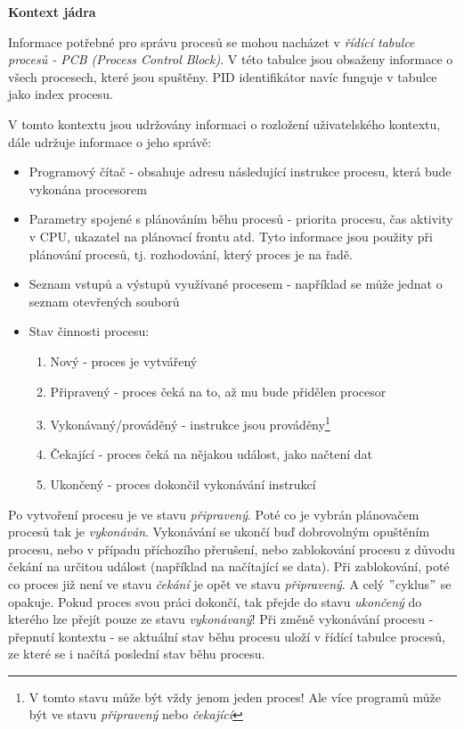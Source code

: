 \begin{Large}
    \vspace{0,5cm}
    \textbf{Kontext jádra}
\end{Large}

Informace potřebné pro správu procesů se mohou nacházet v \textit{řídící tabulce procesů - PCB (Process Control Block)}. V této tabulce jsou obsaženy informace o všech procesech, které jsou spuštěny. PID identifikátor navíc funguje v tabulce jako index procesu. 

\vspace{0,5cm}

V tomto kontextu jsou udržovány informaci o rozložení uživatelského kontextu, dále udržuje informace o jeho správě:
\begin{itemize}
    \item Programový čítač - obsahuje adresu následující instrukce procesu, která bude vykonána procesorem
    \item Parametry spojené s plánováním běhu procesů - priorita procesu, čas aktivity v CPU, ukazatel na plánovací frontu atd. Tyto informace jsou použity při plánování procesů, tj. rozhodování, který proces je na řadě. 
    \item Seznam vstupů a výstupů využívané procesem - například se může jednat o seznam otevřených souborů
    
    \newpage
    
    \item Stav činnosti procesu:
    \begin{enumerate}
        \item Nový - proces je vytvářený
        \item Připravený - proces čeká na to, až mu bude přidělen procesor
        \item Vykonávaný/prováděný - instrukce jsou prováděny\footnote{V tomto stavu může být vždy jenom jeden proces! Ale více programů může být ve stavu \textit{připravený} nebo \textit{čekající}}
        \item Čekající - proces čeká na nějakou událost, jako načtení dat
        \item Ukončený - proces dokončil vykonávání instrukcí
    \end{enumerate}
\end{itemize}

Po vytvoření procesu je ve stavu \textit{připravený}. Poté co je vybrán plánovačem procesů tak je \textit{vykonáván}. Vykonávání se ukončí buď dobrovolným opuštěním procesu, nebo v případu příchozího přerušení, nebo zablokování procesu z důvodu čekání na určitou událost (například na načítající se data). Při zablokování, poté co proces již není ve stavu \textit{čekání} je opět ve stavu \textit{připravený}. A celý $"$cyklus$"$ se opakuje. Pokud proces svou práci dokončí, tak přejde do stavu \textit{ukončený} do kterého lze přejít pouze ze stavu \textit{vykonávaný}! Při změně vykonávání procesu - přepnutí kontextu - se aktuální stav běhu procesu uloží v řídící tabulce procesů, ze které se i načítá poslední stav běhu procesu.

